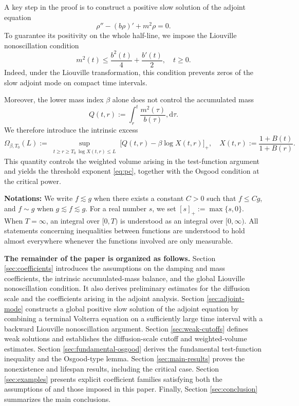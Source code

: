\documentclass[11pt,reqno]{amsart}
\theoremstyle{definition}
\theoremstyle{remark}
\begin{document}
	A key step in the proof is to construct a positive slow solution of the adjoint equation
	$$
	\rho''-(b\rho)'+m^2\rho=0.
	$$
	To guarantee its positivity on the whole half-line, we impose the
	Liouville nonoscillation condition
	$$
	m^2(t)\leq\frac{b^2(t)}4+\frac{b'(t)}2,
	\quad t\geq0.
	$$
	Indeed, under the Liouville transformation, this condition prevents zeros of the slow adjoint mode on compact time intervals.
	
	Moreover, the lower mass index $\beta$ alone does not control the
	accumulated mass
	$$
	Q(t,r):=\int_r^t\frac{m^2(\tau)}{b(\tau)},\mathrm{d}\tau.
	$$
	We therefore introduce the intrinsic excess
	$$
	\Omega_{\beta,T_0}(L)
	:=
	\sup_{\substack{t\geq r\geq T_0\
			\log X(t,r)\leq L}}
	\bigl[Q(t,r)-\beta\log X(t,r)\bigr]_+,
	\quad
	X(t,r):=\frac{1+B(t)}{1+B(r)}.
	$$
	This quantity controls the weighted volume arising in the test-function argument and yields the threshold exponent \eqref{eq:pc}, together with the Osgood condition at the critical power.
	
	\textbf{Notations:} We write $f\lesssim g$ when there exists a constant $C>0$ such that $f\le Cg$, and $f \sim g$ when $g\lesssim f\lesssim g$. For a real number $s$, we set $[s]_+:=\max\{s,0\}$. When $T=\infty$, an integral over $[0,T)$ is understood as an
	integral over $[0,\infty)$. All statements concerning inequalities
	between functions are understood to hold almost everywhere whenever
	the functions involved are only measurable.
	
	\textbf{The remainder of the paper is organized as follows.} Section \ref{sec:coefficients} introduces the assumptions on the
	damping and mass coefficients, the intrinsic accumulated-mass
	balance, and the global Liouville nonoscillation condition. It also
	derives preliminary estimates for the diffusion scale and the
	coefficients arising in the adjoint analysis.
	Section \ref{sec:adjoint-mode} constructs a global positive slow
	solution of the adjoint equation by combining a terminal Volterra
	equation on a sufficiently large time interval with a backward
	Liouville nonoscillation argument. Section \ref{sec:weak-cutoffs} defines weak solutions and establishes
	the diffusion-scale cutoff and weighted-volume estimates.
	Section \ref{sec:fundamental-osgood} derives the fundamental
	test-function inequality and the Osgood-type lemma. Section \ref{sec:main-results} proves the nonexistence and lifespan
	results, including the critical case. Section \ref{sec:examples} presents explicit coefficient families satisfying both the assumptions of \cite{DGR2019} and those imposed in this paper. Finally, Section \ref{sec:conclusion} summarizes the main conclusions.
	
\end{document}
